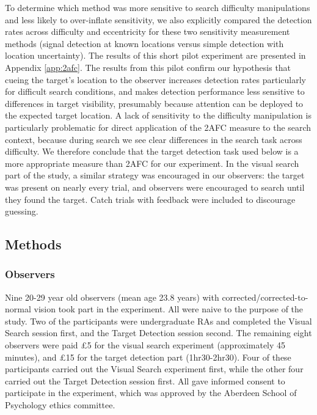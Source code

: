 \documentclass[man]{apa6}
\begin{document}
To determine which method was more sensitive to search difficulty manipulations and less likely to over-inflate sensitivity, we also explicitly compared the detection rates across difficulty and eccentricity for these two sensitivity measurement methods (signal detection at known locations versus simple detection with location uncertainty). The results of this short pilot experiment are presented in Appendix \ref{app:2afc}. The results from this pilot confirm our hypothesis that cueing the target's location to the observer increases detection rates particularly for difficult search conditions, and makes detection performance less sensitive to differences in target visibility, presumably because attention can be deployed to the expected target location. A lack of sensitivity to the difficulty manipulation is particularly problematic for direct application of the 2AFC measure to the search context, because during search we see clear differences in the search task across difficulty. We therefore conclude that the target detection task used below is a more appropriate measure than 2AFC for our experiment. In the visual search part of the study, a similar strategy was encouraged in our observers: the target was present on nearly every trial, and observers were encouraged to search until they found the target. Catch trials with feedback were included to discourage guessing.

\subsection{Methods}

\subsubsection{Observers}
Nine 20-29 year old observers (mean age 23.8 years) with corrected/corrected-to-normal vision took part in the experiment. All were naive to the purpose of the study. Two of the participants were undergraduate RAs and completed the Visual Search session first, and the Target Detection session second. The remaining eight observers were paid \pounds 5 for the visual search experiment (approximately 45 minutes), and \pounds 15 for the target detection part (1hr30-2hr30). Four of these participants carried out the Visual Search experiment first, while the other four carried out the Target Detection session first. All gave informed consent to participate in the experiment, which was approved by the Aberdeen School of Psychology ethics committee.
\end{document}

